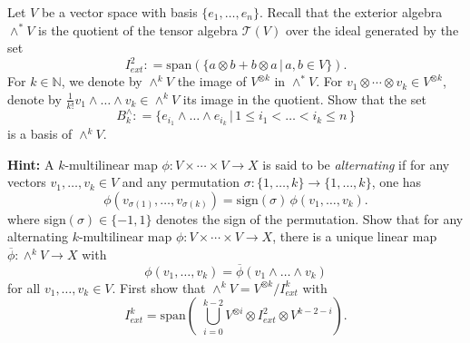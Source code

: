 \documentclass{ximera}
\begin{document}
    
\begin{exercise}
     Let $V$ be a  vector space with basis $\{ e_1 , \ldots , e_n \}$. Recall that the exterior algebra $\wedge ^{\ast} V$ is the quotient of the tensor algebra $\mathcal{T}(V)$ over the ideal generated by the set 
    \[  I_{ext} ^2 : =  \text{span}( \{  a \otimes b + b \otimes a \, \vert \, a,b \in V \} )  .   \]
    For $k \in \mathbb{N}$, we denote by $\wedge ^k V$ the image of $V^{\otimes k}$ in  $\wedge ^{\ast} V$. For  $v_1 \otimes \cdots \otimes v_k \in V^{\otimes k}$, denote by $\tfrac{1}{k!} v_1 \wedge \ldots \wedge v_k \in \wedge ^{k}V$ its image in the quotient. Show that the set
    \[     B^{\wedge}_k : = \{  e_{i_1} \wedge \ldots \wedge e_{i_k}\, \vert \, 1 \leq i_1 < \ldots  < i_k \leq n  \, \}        \]
    is a basis of $\wedge ^k V$. 

    \textbf{Hint: }   A $k$-multilinear map  $ \phi : V \times \cdots \times V \to X$ is said to be \emph{alternating} if for any  vectors $v_1, \ldots , v_k \in V$ and any permutation $\sigma : \{ 1, \ldots, k \} \to \{ 1, \ldots , k \}$, one has 
    \[   \phi (v_{\sigma(1)}, \ldots , v_{\sigma (k)}) = \text{sign} (\sigma ) \,  \phi ( v_1,  \ldots , v_k  ) .     \]
     where sign$(\sigma ) \in \{ -1 , 1 \} $ denotes the sign of the permutation. Show that for any alternating $k$-multilinear map $\phi : V\times \cdots \times  V \to X$, there is a unique linear map $\overline{\phi} : \wedge ^k V \to X$ with
     \[    \phi (v_1, \ldots , v_k) = \overline{\phi} (v_1 \wedge \ldots \wedge v_k)          \]
     for all $v_1, \ldots , v_k \in V$.  First show that $\wedge ^k V = V^{\otimes k} / I_{ext}^k$ with 
    \[       I_{ext}^k =  \text{span} \left( \, \, \bigcup_{i = 0}^{k-2}  V^{\otimes i} \otimes I_{ext}^2 \otimes V^{k-2-i}   \right)   .    \]

\end{exercise}
    
     
\end{document}
